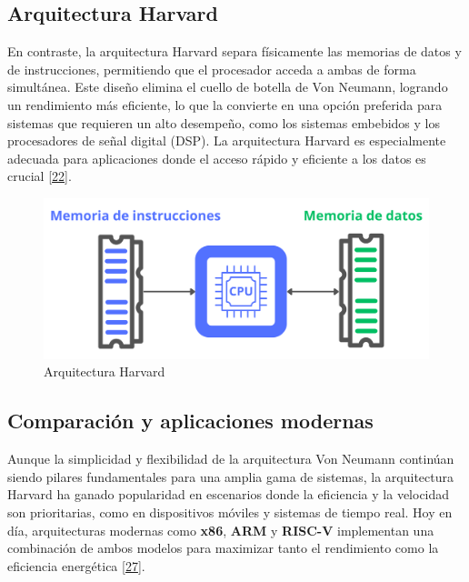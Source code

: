 \documentclass[12pt,oneside]{templates/unerthesis}
\begin{document}
\hypertarget{arquitectura-harvard}{%
\subsection{Arquitectura Harvard}\label{arquitectura-harvard}}

En contraste, la arquitectura Harvard separa físicamente las memorias de datos y de instrucciones, permitiendo que el procesador acceda a ambas de forma simultánea. Este diseño elimina el cuello de botella de Von Neumann, logrando un rendimiento más eficiente, lo que la convierte en una opción preferida para sistemas que requieren un alto desempeño, como los sistemas embebidos y los procesadores de señal digital (DSP). La arquitectura Harvard es especialmente adecuada para aplicaciones donde el acceso rápido y eficiente a los datos es crucial \protect\hyperlink{ref-tanenbaum_structured_2013}{{[}22{]}}.

\begin{figure}

{\centering \includegraphics[width=0.85\linewidth]{images/harvard} 

}

\caption{Arquitectura Harvard}\label{fig:harvard}
\end{figure}

\hypertarget{comparaciuxf3n-y-aplicaciones-modernas}{%
\subsection{Comparación y aplicaciones modernas}\label{comparaciuxf3n-y-aplicaciones-modernas}}

Aunque la simplicidad y flexibilidad de la arquitectura Von Neumann continúan siendo pilares fundamentales para una amplia gama de sistemas, la arquitectura Harvard ha ganado popularidad en escenarios donde la eficiencia y la velocidad son prioritarias, como en dispositivos móviles y sistemas de tiempo real. Hoy en día, arquitecturas modernas como \textbf{x86}, \textbf{ARM} y \textbf{RISC-V} implementan una combinación de ambos modelos para maximizar tanto el rendimiento como la eficiencia energética \protect\hyperlink{ref-null_essentials_2014}{{[}27{]}}.
\end{document}
